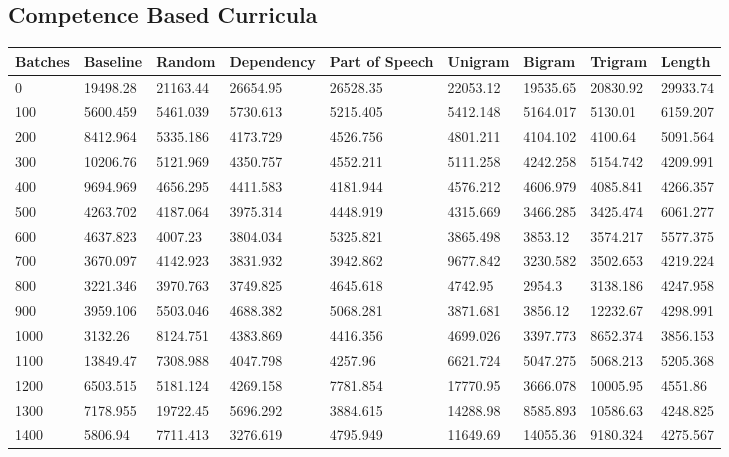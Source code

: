 \documentclass [11pt, proquest] {uwthesis}[2020/12/20]
\begin{document}
\subsection{Competence Based Curricula}
\begin{table}
\begin{tiny}
\centering
\begin{tabular}{|l|l|l|l|l|l|l|l|l|}
\hline
Batches & Baseline & Random & Dependency & Part of Speech & Unigram & Bigram & Trigram & Length \\ \hline
0 & 19498.28 & 21163.44 & 26654.95 & 26528.35 & 22053.12 & 19535.65 & 20830.92 & 29933.74 \\ \hline
100 & 5600.459 & 5461.039 & 5730.613 & 5215.405 & 5412.148 & 5164.017 & 5130.01 & 6159.207 \\ \hline
200 & 8412.964 & 5335.186 & 4173.729 & 4526.756 & 4801.211 & 4104.102 & 4100.64 & 5091.564 \\ \hline
300 & 10206.76 & 5121.969 & 4350.757 & 4552.211 & 5111.258 & 4242.258 & 5154.742 & 4209.991 \\ \hline
400 & 9694.969 & 4656.295 & 4411.583 & 4181.944 & 4576.212 & 4606.979 & 4085.841 & 4266.357 \\ \hline
500 & 4263.702 & 4187.064 & 3975.314 & 4448.919 & 4315.669 & 3466.285 & 3425.474 & 6061.277 \\ \hline
600 & 4637.823 & 4007.23 & 3804.034 & 5325.821 & 3865.498 & 3853.12 & 3574.217 & 5577.375 \\ \hline
700 & 3670.097 & 4142.923 & 3831.932 & 3942.862 & 9677.842 & 3230.582 & 3502.653 & 4219.224 \\ \hline
800 & 3221.346 & 3970.763 & 3749.825 & 4645.618 & 4742.95 & 2954.3 & 3138.186 & 4247.958 \\ \hline
900 & 3959.106 & 5503.046 & 4688.382 & 5068.281 & 3871.681 & 3856.12 & 12232.67 & 4298.991 \\ \hline
1000 & 3132.26 & 8124.751 & 4383.869 & 4416.356 & 4699.026 & 3397.773 & 8652.374 & 3856.153 \\ \hline
1100 & 13849.47 & 7308.988 & 4047.798 & 4257.96 & 6621.724 & 5047.275 & 5068.213 & 5205.368 \\ \hline
1200 & 6503.515 & 5181.124 & 4269.158 & 7781.854 & 17770.95 & 3666.078 & 10005.95 & 4551.86 \\ \hline
1300 & 7178.955 & 19722.45 & 5696.292 & 3884.615 & 14288.98 & 8585.893 & 10586.63 & 4248.825 \\ \hline
1400 & 5806.94 & 7711.413 & 3276.619 & 4795.949 & 11649.69 & 14055.36 & 9180.324 & 4275.567 \\ \hline

\end{tabular}
\end{tiny}
\end{table}
\end{document}
